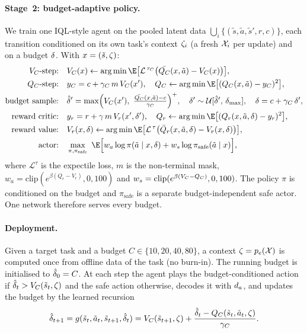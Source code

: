 \paragraph{Stage~2: budget-adaptive policy.}
We train one IQL-style agent on the pooled latent data
$\bigcup_i\{(\tilde s,\tilde a,\tilde s',r,c)\}$, each transition conditioned on
its own task's context $\zeta_i$ (a fresh $\mathcal{X}_i$ per update) and on a budget
$\delta$.  With $x=(\tilde s,\zeta)$:
\begin{align}
  \VC\text{-step:}\quad
  & \VC(x)\leftarrow \arg\min \E\big[\mathcal{L}^{\,\tau_C}\big(\bar\QC(x,\tilde a)-\VC(x)\big)\big],
  \notag\\
  \QC\text{-step:}\quad
  & y_C = c + \gamma_C\,m\,\VC(x'),\quad
    \QC\leftarrow\arg\min\E\big[(\QC(x,\tilde a)-y_C)^2\big],
  \notag\\
  \text{budget sample:}\quad
  & \hat\bud' = \max\!\Big(\VC(x'),\ \tfrac{\bar\QC(x,\tilde a)-c}{\gamma_C}\Big)^{+},\quad
    \bud'\sim\mathcal{U}[\hat\bud',\,\bud_{\max}],\quad
    \bud=c+\gamma_C\,\bud',
  \notag\\
  \text{reward critic:}\quad
  & y_r=r+\gamma\,m\,V_r(x',\bud'),\quad
    Q_r\leftarrow\arg\min\E\big[(Q_r(x,\tilde a,\bud)-y_r)^2\big],
  \notag\\
  \text{reward value:}\quad
  & V_r(x,\bud)\leftarrow\arg\min\E\big[\mathcal{L}^{\,\tau}\big(\bar Q_r(x,\tilde a,\bud)-V_r(x,\bud)\big)\big],
  \notag\\
  \text{actor:}\quad
  & \max_{\pi,\pi_{\mathrm{safe}}}\ \E\Big[
    w_a\log\pi(\tilde a\mid x,\bud) + w_s\log\pi_{\mathrm{safe}}(\tilde a\mid x)\Big],
  \label{eq:copdt-iql}
\end{align}
where $\mathcal{L}^{\tau}$ is the expectile loss, $m$ is the non-terminal mask,
$w_a=\mathrm{clip}(e^{\beta(Q_r-V_r)},0,100)$ and
$w_s=\mathrm{clip}(e^{\beta(V_C-Q_C)},0,100)$.  The policy $\pi$ is conditioned
on the budget and $\pi_{\mathrm{safe}}$ is a separate budget-independent safe actor.  One
network therefore serves every budget.

\paragraph{Deployment.}
Given a target task and a budget $C\in\{10,20,40,80\}$, a context
$\zeta=p_e(\mathcal{X})$ is computed once from offline data of the task (no burn-in).
The running budget is initialised to $\hat{\delta}_0=C$.  At each step the agent
plays the budget-conditioned action if $\hat{\delta}_t>V_C(\tilde s_t,\zeta)$ and the
safe action otherwise, decodes it with $d_a$, and updates the budget by the
learned recursion
\begin{equation}
  \hat{\delta}_{t+1} = g(\tilde s_t,\tilde a_t,\tilde s_{t+1},\hat{\delta}_t)
  = V_C(\tilde s_{t+1},\zeta)+\frac{\hat{\delta}_t-Q_C(\tilde s_t,\tilde a_t,\zeta)}{\gamma_C}.
  \label{eq:copdt-budget}
\end{equation}

